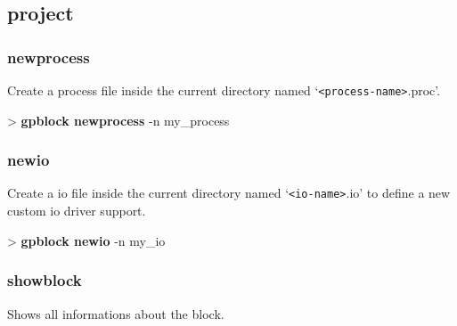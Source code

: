 \documentclass[10pt,a4paper]{article}
\begin{document}
\subsection{project}
\subsubsection{newprocess}

Create a process file inside the current directory named `\texttt{<process-name>}.proc'.\\


\begin{sampletitle}
> \textbf{gpblock newprocess} -n my\_process
\end{sampletitle}

\subsubsection{newio}

Create a io file inside the current directory named `\texttt{<io-name>}.io' to define a new custom io driver support.\\


\begin{sampletitle}
> \textbf{gpblock newio} -n my\_io
\end{sampletitle}

\subsubsection{showblock}

Shows all informations about the block.

\end{document}
